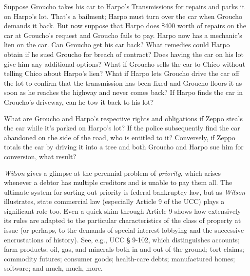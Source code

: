\item Suppose Groucho takes his car to Harpo's Transmissions for repairs and
parks it on Harpo's lot. That's a bailment; Harpo must turn over the car when
Groucho demands it back. But now suppose that Harpo does \$400 worth of repairs
on the car at Groucho's request and Groucho fails to pay. Harpo now has a
mechanic's lien on the car. Can Groucho get his car back? What remedies could
Harpo obtain if he sued Groucho for breach of contract? Does having the car on
his lot give him any additional options? What if Groucho sells the car to Chico
without telling Chico about Harpo's lien? What if Harpo lets Groucho drive the
car off the lot to confirm that the transmission has been fixed and Groucho
floors it as soon as he reaches the highway and never comes back? If Harpo
finds the car in Groucho's driveway, can he tow it back to his lot?


\item What are Groucho and Harpo's respective rights and obligations if Zeppo
steals the car while it's parked on Harpo's lot? If the police subsequently
find the car abandoned on the side of the road, who is entitled to it?
Conversely, if Zeppo totals the car by driving it into a tree and both Groucho
and Harpo sue him for conversion, what result?


\item \textit{Wilson} gives a glimpse at the perennial problem of
\textit{priority}, which arises whenever a debtor has multiple creditors and is
unable to pay them all. The ultimate system for sorting out priority is federal
bankruptcy law, but as \textit{Wilson} illustrates, state commercial law
(especially Article 9 of the UCC) plays a significant role too. Even a quick
skim through Article 9 shows how extensively its rules are adapted to the
particular characteristics of the class of property at issue (or perhaps, to
the demands of special-interest lobbying and the successive encrustations of
history). See, e.g., UCC {\S} 9-102, which distinguishes accounts; farm
products; oil, gas, and minerals both in and out of the ground; tort claims;
commodity futures; consumer goods; health-care debts; manufactured homes;
software; and much, much, more. 


